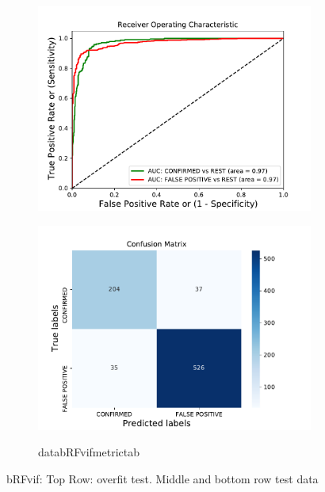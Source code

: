 \begin{figure}[H]
\begin{subfigure}{.49\textwidth}
                \includegraphics[width = 1\textwidth]{data/bRF_vif_roc.pdf}
                \end{subfigure}
                \begin{subfigure}{.49\textwidth}
                \includegraphics[width = 1\textwidth]{data/bRF_vif_cm.pdf}
                \end{subfigure}
                \begin{subfigure}{1\textwidth}
                \csname databRFvifmetrictab\endcsname
                \end{subfigure}
                \caption{bRFvif: Top Row: overfit test. Middle and bottom row test data}
                \label{fig:data/bRF_vif_roc}
                \end{figure}